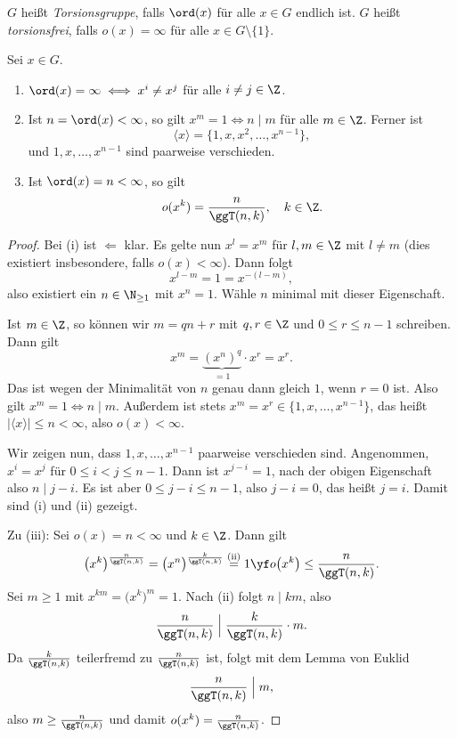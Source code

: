 \documentclass[11pt]{article}
\begin{document}
\begin{definition}[Torsion]\Theorem
  $G$ heißt \emph{Torsionsgruppe}, falls $\ord(x)$ für alle $x \in G$ endlich ist.
  $G$ heißt \emph{torsionsfrei}, falls $o(x) = \infty$ für alle $x \in G \setminus \{1\}$.
\end{definition}


\begin{proposition}\label{prop:ordnung}
  Sei $x \in G$.
  \begin{enumerate}[label=(\roman*)]
    \item $\ord(x) = \infty \iff x^i \neq x^j$ für alle $i \neq j \in \Z$.
    \item Ist $n = \ord(x) < \infty$, so gilt $x^m = 1 \iff n \mid m$ für alle $m \in \Z$. Ferner ist
      \[ \langle x \rangle = \{1, x, x^2, \dots, x^{n-1}\}, \]
      und $1, x, \dots, x^{n-1}$ sind paarweise verschieden.
    \item Ist $\ord(x) = n < \infty$, so gilt
      \[ o(x^k) = \frac{n}{\ggT(n, k)}, \quad k \in \Z. \]
  \end{enumerate}
\end{proposition}
\begin{proof}
  Bei (i) ist \glqq$\Leftarrow$\grqq{} klar. Es gelte nun $x^l = x^m$ für $l, m \in \Z$ mit $l \neq m$ (dies existiert insbesondere, falls $o(x) < \infty$). Dann folgt
  \[ x^{l-m} = 1 = x^{-(l-m)}, \]
  also existiert ein $n \in \N_{\ge 1}$ mit $x^n = 1$. Wähle $n$ minimal mit dieser Eigenschaft.

  Ist $m \in \Z$, so können wir $m = qn + r$ mit $q, r \in \Z$ und $0 \le r \le n - 1$ schreiben. Dann gilt
  \[ x^m = \underbrace{(x^n)^q}_{= 1} \cdot x^r = x^r. \]
  Das ist wegen der Minimalität von $n$ genau dann gleich $1$, wenn $r = 0$ ist. Also gilt $x^m = 1 \iff n \mid m$.
  Außerdem ist stets $x^m = x^r \in \{1, x, \dots, x^{n-1}\}$, das heißt $\lvert \langle x \rangle \rvert \le n < \infty$, also $o(x) < \infty$.

  Wir zeigen nun, dass $1, x, \dots, x^{n-1}$ paarweise verschieden sind.
  Angenommen, $x^i = x^j$ für $0 \le i < j \le n-1$. Dann ist $x^{j-i} = 1$, nach der obigen Eigenschaft also $n \mid j - i$. Es ist aber $0 \le j - i \le n-1$, also $j - i = 0$, das heißt $j = i$.
  Damit sind (i) und (ii) gezeigt.

  Zu (iii): Sei $o(x) = n < \infty$ und $k \in \Z$. Dann gilt
  \[ \bigl(x^k\bigr)^{\frac{n}{\ggT(n, k)}} = \bigl(x^n\bigr)^{\frac{k}{\ggT(n, k)}} \overset{\text{(ii)}}{=} 1 \yf o\bigl(x^k\bigr) \le \frac{n}{\ggT(n, k)}. \]
  Sei $m \ge 1$ mit $x^{km} = \bigl(x^k\bigr)^m = 1$. Nach (ii) folgt $n \mid km$, also
  \[ \frac{n}{\ggT(n, k)} \;\Big|\; \frac{k}{\ggT(n, k)} \cdot m. \]
  Da $\frac{k}{\ggT(n, k)}$ teilerfremd zu $\frac{n}{\ggT(n, k)}$ ist, folgt mit dem Lemma von Euklid
  \[ \frac{n}{\ggT(n, k)} \;\Big|\; m, \]
  also $m \ge \frac{n}{\ggT(n, k)}$ und damit $o(x^k) = \frac{n}{\ggT(n, k)}$.
\end{proof}
\end{document}
